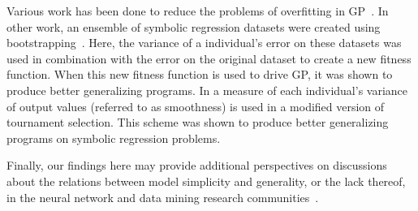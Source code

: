 Various work has been done to reduce the problems of overfitting in GP~\cite{goncalves:2013:EuroGP, 1144159, DBLP:conf/gecco/VanneschiG09, Castelli:2010:cec, Goncalves:2015:EuroGP}. In other work, an ensemble of symbolic regression datasets were created using bootstrapping~\cite{conf/ppsn/Agapitos12}. Here, the variance of a individual's error on these datasets was used in combination with the error on the original dataset to create a new fitness function. When this new fitness function is used to drive GP, it was shown to produce better generalizing programs.
In \cite{Azad:2011:GECCO} a measure of each individual's variance of output values (referred to as smoothness) is used in a modified version of tournament selection. This scheme was shown to produce better generalizing programs on symbolic regression problems.



%
%
%
%


Finally, our findings here may provide additional perspectives on discussions about the relations between model simplicity and generality, or the lack thereof, in the neural network and data mining research communities~\cite{domingos2016master}.



